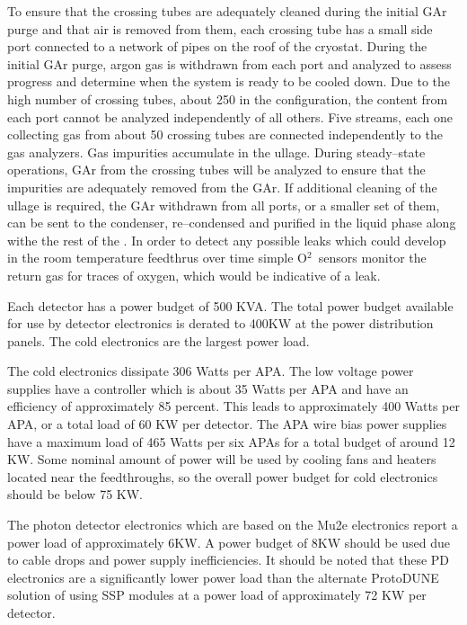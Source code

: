 To ensure that the crossing tubes are adequately cleaned during the initial GAr purge and that air is removed from them, each crossing tube has a small side port connected to a network of pipes on the roof of the cryostat. During the initial GAr purge, argon gas is withdrawn from each port and analyzed to assess progress and determine when the system is ready to be cooled down. Due to the high number of crossing tubes, about 250 in the  configuration, the content from each port cannot be analyzed independently of all others. Five streams, each one collecting gas from about 50 crossing tubes are connected independently to the gas analyzers. Gas impurities accumulate in the ullage. During steady--state operations, GAr from the crossing tubes will be analyzed to ensure that the impurities are adequately removed from the GAr.    If additional cleaning of the ullage is required, the GAr withdrawn from all ports, or a smaller set of them, can be sent to the condenser, re--condensed and purified in the liquid phase along withe the rest of the . In order to detect any possible leaks which could develop in the room temperature feedthrus over time simple O$^2$\ sensors monitor the return gas for traces of oxygen, which would be indicative of a leak.

Each detector has a power budget of 500 KVA. The total power budget available for use by detector electronics is derated to 400KW at the power distribution panels.  The cold electronics are the largest power load.  

The cold electronics dissipate 306 Watts per APA.  The low voltage power supplies have a controller which is about 35 Watts per APA and have an efficiency of approximately 85 percent.  This leads to approximately 400 Watts per APA, or a total load of 60 KW per detector.  The APA wire bias power supplies have a maximum load of 465 Watts per six APAs for a total budget of around 12 KW.  Some nominal amount of power will be used by cooling fans and heaters located near the feedthroughs, so the overall power budget for cold electronics should be below 75 KW.

The photon detector electronics which are based on the Mu2e electronics report a power load of approximately 6KW.  A power budget of 8KW should be used due to cable drops and  power supply inefficiencies.  It should be noted that these PD electronics are a significantly lower power load than the alternate ProtoDUNE solution of using SSP modules at a power load of approximately 72 KW per detector.


